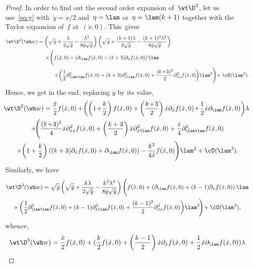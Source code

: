 \begin{proof}
In order to find out the second order expansion of~$\wt\D^2$, let us use~\eqref{eq:y} with~$\dot y=\dot x/2$ and~$\eta= \lam$ or~$\eta = \lam(k+1)$ together with the Taylor expansion of~$f$ at~$(\dot x,0)$. This~gives
\begin{align*}
\wt\D^2(\wh w)&=\left(\sqrt{\dot y}+\frac{\lambda}{2\sqrt{\dot y}}-\frac{\lambda^2}{8\dot y\sqrt{\dot y}}\right)
\left(\sqrt{\dot y}+\frac{(k+1)\lambda}{2\sqrt{\dot y}}-\frac{(k+1)^2\lambda^2}{8\dot y\sqrt{\dot y}}\right)\\
&\quad\;\times\!\Bigg(f(\dot x,0)+
\left(\partial_\lam f(\dot x,0)+(k+3)\partial_{\dot x}f(\dot x,0)\right)\lam\\
&\qquad\quad+\!\left(\frac12\partial_{\lam\lam}^2f(\dot x,0)+(k+3)\partial^2_{\dot x\lam}f(\dot x,0)+\frac{(k\!+\!3)^2}2\partial^2_{\dot x\dot x}f(\dot x,0)\!\right)\!\lam^2\Bigg)\!+\cO(\lam^3)\cdotp
\end{align*}
Hence, we get in the end, replacing $\dot y$ by its value,
\begin{multline}\label{eq:Dp2}
\!\!\wt\D^2(\wh w) =\frac{\dot x}2f(\dot x,0)+\!\left(\left(1\!+\!\frac k2\right)f(\dot x,0)+\left(\frac{k\!+\!3}2\right)\dot x\partial_{\dot x}f(\dot x,0) \!+\!\frac12{\dot x}\partial_\lam f(\dot x,0)\right)\!\lambda\\
+\!\Bigg(\frac{(k\!+\!3)^2}4\dot x\partial^2_{\dot x\dot x}f(\dot x,0)+\left(\frac{k+3}2\right)\dot x\partial^2_{\dot x\lam}f(\dot x,0) +\frac{\dot x}4\partial^2_{\lam\lam}f(\dot x,0)\\
+\!\left(1+\frac k2\right)\left((k+3)\partial_{\dot x}f(\dot x,0)+\partial_\lam f(\dot x,0)\right)-\frac{k^2}{4\dot x} f(\dot x,0)\Bigg)\lam^2+\cO(\lam^3).
\end{multline}
Similarly, we have
\begin{multline*}
\wt\D^3 (\wh w)=\sqrt{\dot y}\left(\sqrt{\dot y}+\frac{k\lambda}{2\sqrt{\dot y}}-\frac{k^2\lambda^2}{8\dot y\sqrt{\dot y}}\right)
\Bigg(f(\dot x,0)+\left(\partial_\lam f(\dot x,0)+(k-1)\partial_{\dot x}f(\dot x,0)\right)\lam\\
+\left(\frac12\partial_{\lam\lam}^2f(\dot x,0)+(k-1)\partial^2_{\dot x\lam}f(\dot x,0)+\frac{(k-1)^2}2\partial^2_{\dot x\dot x}f(\dot x,0)\right)\!\lam^2\!\Bigg)\!+\cO(\lam^3),
\end{multline*}
whence,
\begin{multline}\label{eq:Dp3}
\wt\D^3(\wh w)=\frac{\dot x}2f(\dot x,0)+(\frac k2 f(\dot x,0)+\left(\frac{k-1}2\right)\dot x\partial_{\dot x}f(\dot x,0)+\frac12{\dot x}\partial_\lam f(\dot x,0))\lambda\\

\end{multline}
\end{proof}

